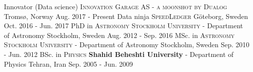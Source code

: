 \begin{cventries}
  \cventry
    {\normalsize Innovator (Data science)}
    {\textsc{Innovation Garage AS - a moonshot by Dualog}}
    {\normalsize Tromsø, Norway}
    {\normalsize Aug. 2017 - Present}
    {}
  \cventry
    {\normalsize Data ninja}
    {\textsc{SpeedLedger}}
    {\normalsize Göteborg, Sweden}
    {\normalsize Oct. 2016 - Jun. 2017}
    {}
  \cventry
    {\normalsize PhD in \textsc{Astronomy}}
    {\textsc{Stockholm University} - Department of Astronomy}
    {\normalsize Stockholm, Sweden}
    {\normalsize Aug. 2012 - Sep. 2016}
    {}
  \cventry
    {\normalsize MSc. in \textsc{Astronomy}}
    {\textsc{Stockholm University} - Department of Astronomy}
    {\normalsize Stockholm, Sweden}
    {\normalsize Sep. 2010 - Jun. 2012}
    {}
  \cventry
    {\normalsize BSc. in \textsc{Physics}}
    {\textbf{Shahid Beheshti University} - Department of Physics}
    {\normalsize Tehran, Iran}
    {\normalsize Sep. 2005 - Jun. 2009}
    {}
\end{cventries}
